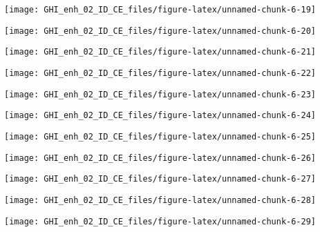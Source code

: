 \documentclass[
  10pt,
  a4paper,oneside]{article}
\begin{document}
\begin{center}\texttt{[image: GHI\_enh\_02\_ID\_CE\_files/figure-latex/unnamed-chunk-6-19]} \end{center}

\begin{center}\texttt{[image: GHI\_enh\_02\_ID\_CE\_files/figure-latex/unnamed-chunk-6-20]} \end{center}

\begin{center}\texttt{[image: GHI\_enh\_02\_ID\_CE\_files/figure-latex/unnamed-chunk-6-21]} \end{center}

\begin{center}\texttt{[image: GHI\_enh\_02\_ID\_CE\_files/figure-latex/unnamed-chunk-6-22]} \end{center}

\begin{center}\texttt{[image: GHI\_enh\_02\_ID\_CE\_files/figure-latex/unnamed-chunk-6-23]} \end{center}

\begin{center}\texttt{[image: GHI\_enh\_02\_ID\_CE\_files/figure-latex/unnamed-chunk-6-24]} \end{center}

\begin{center}\texttt{[image: GHI\_enh\_02\_ID\_CE\_files/figure-latex/unnamed-chunk-6-25]} \end{center}

\begin{center}\texttt{[image: GHI\_enh\_02\_ID\_CE\_files/figure-latex/unnamed-chunk-6-26]} \end{center}

\begin{center}\texttt{[image: GHI\_enh\_02\_ID\_CE\_files/figure-latex/unnamed-chunk-6-27]} \end{center}

\begin{center}\texttt{[image: GHI\_enh\_02\_ID\_CE\_files/figure-latex/unnamed-chunk-6-28]} \end{center}

\begin{center}\texttt{[image: GHI\_enh\_02\_ID\_CE\_files/figure-latex/unnamed-chunk-6-29]} \end{center}
\end{document}
